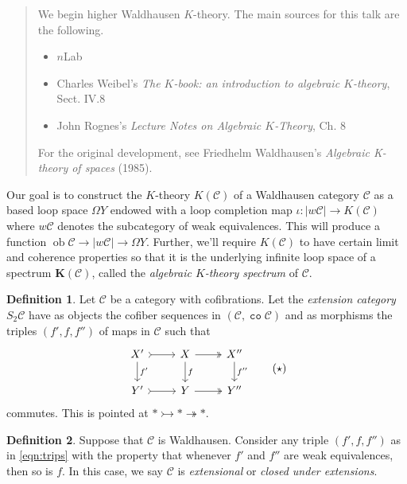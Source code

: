 \documentclass[10pt,letterpaper,cm]{nupset}
\theoremstyle{definition}
\newtheorem{definition}{Definition}
\theoremstyle{theorem}
\theoremstyle{remark}
\newcommand{\1}{\mathbf{1}}
\renewcommand{\c}{\mathscr{C}}
\newcommand{\0}{\vec 0}
\DeclareMathOperator{\co}{\mathtt{co}}
\DeclareMathOperator{\ob}{ob}
\begin{document}
\begin{abstract}
We begin higher Waldhausen $K$-theory. The main sources for this talk are the following.
\begin{itemize}
\item $n$Lab
\item Charles Weibel's \textit{The $K$-book: an introduction to algebraic $K$-theory},  Sect. IV.8
\item John Rognes's \textit{Lecture Notes on Algebraic $K$-Theory}, Ch. 8
\end{itemize}
For the original development, see Friedhelm Waldhausen's \textit{Algebraic K-theory of spaces} (1985). 
\end{abstract}

\smallskip

Our goal is to construct the $K$-theory $K(\c)$ of a Waldhausen category $\c$ as a based loop space $\Omega Y$ endowed with a loop completion map $ \iota : \left\lvert{w{\c}}\right\rvert \to K(\c)$ where $w{\c}$ denotes the subcategory of weak equivalences. This will produce a function $\ob \c \to \left\lvert{w{\c}}\right\rvert \to \Omega Y$. Further, we'll require $K(\c)$ to have certain limit and coherence properties so that it is the underlying infinite loop space of a spectrum $\mathbf{K}(\c)$, called the \textit{algebraic $K$-theory spectrum} of $\c$.

\medskip

\begin{definition}

 Let $\c$ be a category with cofibrations. Let the \textit{extension category} $S_2\c$ have as objects the cofiber sequences in $\left(\c, \co{\c}\right)$ and as morphisms the triples $\left(f', f, f''\right)$ of maps in $\c$ such that
\[ \label{eqn:trips}
\begin{tikzcd}
X' \arrow[r, tail] \arrow[d, "f'"] & X \arrow[r, two heads] \arrow[d, "f"] & X'' \arrow[d, "f''"] \\
Y' \arrow[r, tail] & Y \arrow[r, two heads] & Y''
\end{tikzcd}
\tag{$\star$}
\] 
commutes. This is pointed at $\ast \rightarrowtail \ast \twoheadrightarrow \ast$.
\end{definition}

\begin{definition}
Suppose that $\c$ is Waldhausen. Consider any  triple $\left(f', f, f''\right)$ as in \eqref{eqn:trips} with the property that whenever $f'$ and $f''$ are weak equivalences, then so is $f$. In this case, we say $\c$ is \textit{extensional} or \textit{closed under extensions}.
\end{definition}
\end{document}
